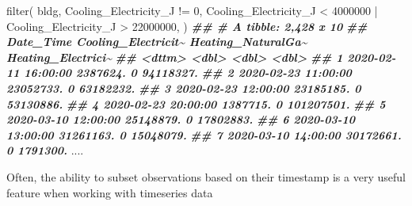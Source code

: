 \documentclass[
]{book}
\newenvironment{Shaded}{\begin{snugshade}}{\end{snugshade}}
\newcommand{\DecValTok}[1]{\textcolor[rgb]{0.00,0.00,0.81}{#1}}
\newcommand{\DocumentationTok}[1]{\textcolor[rgb]{0.56,0.35,0.01}{\textbf{\textit{#1}}}}
\newcommand{\FunctionTok}[1]{\textcolor[rgb]{0.00,0.00,0.00}{#1}}
\newcommand{\NormalTok}[1]{#1}
\newcommand{\SpecialCharTok}[1]{\textcolor[rgb]{0.00,0.00,0.00}{#1}}
\begin{document}
\begin{Shaded}
\begin{Highlighting}[]
\FunctionTok{filter}\NormalTok{(}
\NormalTok{  bldg, Cooling\_Electricity\_J }\SpecialCharTok{!=} \DecValTok{0}\NormalTok{,}
\NormalTok{  Cooling\_Electricity\_J }\SpecialCharTok{\textless{}} \DecValTok{4000000} \SpecialCharTok{|}
\NormalTok{    Cooling\_Electricity\_J }\SpecialCharTok{\textgreater{}} \DecValTok{22000000}\NormalTok{,}
\NormalTok{)}
\DocumentationTok{\#\# \# A tibble: 2,428 x 10}
\DocumentationTok{\#\#    Date\_Time           Cooling\_Electricit\textasciitilde{} Heating\_NaturalGa\textasciitilde{} Heating\_Electrici\textasciitilde{}}
\DocumentationTok{\#\#    \textless{}dttm\textgreater{}                            \textless{}dbl\textgreater{}              \textless{}dbl\textgreater{}              \textless{}dbl\textgreater{}}
\DocumentationTok{\#\#  1 2020{-}02{-}11 16:00:00            2387624.                  0          94118327.}
\DocumentationTok{\#\#  2 2020{-}02{-}23 11:00:00           23052733.                  0          63182232.}
\DocumentationTok{\#\#  3 2020{-}02{-}23 12:00:00           23185185.                  0          53130886.}
\DocumentationTok{\#\#  4 2020{-}02{-}23 20:00:00            1387715.                  0         101207501.}
\DocumentationTok{\#\#  5 2020{-}03{-}10 12:00:00           25148879.                  0          17802883.}
\DocumentationTok{\#\#  6 2020{-}03{-}10 13:00:00           31261163.                  0          15048079.}
\DocumentationTok{\#\#  7 2020{-}03{-}10 14:00:00           30172661.                  0           1791300.}
\NormalTok{....}
\end{Highlighting}
\end{Shaded}

Often, the ability to subset observations based on their timestamp is a very useful feature when working with timeseries data
\end{document}
